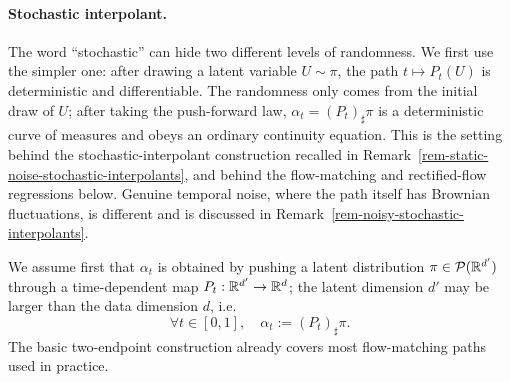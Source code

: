 \paragraph{Stochastic interpolant.}

The word ``stochastic'' can hide two different levels of randomness. We first use the simpler one: after drawing a latent variable $U\sim\pi$, the path $t\mapsto P_t(U)$ is deterministic and differentiable. The randomness only comes from the initial draw of $U$; after taking the push-forward law, $\alpha_t=(P_t)_\sharp\pi$ is a deterministic curve of measures and obeys an ordinary continuity equation. This is the setting behind the stochastic-interpolant construction recalled in Remark~\ref{rem-static-noise-stochastic-interpolants}, and behind the flow-matching and rectified-flow regressions below. Genuine temporal noise, where the path itself has Brownian fluctuations, is different and is discussed in Remark~\ref{rem-noisy-stochastic-interpolants}.

We assume first that $\alpha_t$ is obtained by pushing a latent distribution $\pi \in \mathcal{P}(\mathbb{R}^{d'})$ through a time-dependent map $P_t : \mathbb{R}^{d'} \to \mathbb{R}^d$; the latent dimension $d'$ may be larger than the data dimension $d$, i.e.
\begin{equation}\label{eq:interp-coupling}
	\forall t \in [0,1], \quad \alpha_t := (P_t)_\sharp \pi.
\end{equation}
The basic two-endpoint construction already covers most flow-matching paths used in practice.

